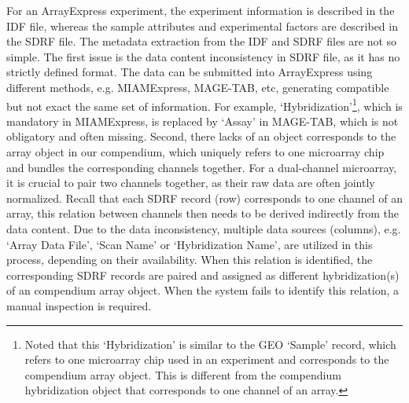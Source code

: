 For an ArrayExpress experiment, the experiment information is described
in the IDF file, whereas the sample attributes and experimental factors
are described in the SDRF file.
%
The metadata extraction from the IDF and SDRF files are not so simple.
%
The first issue is the data content inconsistency in SDRF file, as it has
no strictly defined format.
%
The data can be submitted into ArrayExpress using different methods,
e.g. MIAMExpress, MAGE-TAB, etc, generating compatible but not exact the
same set of information.
%
For example, `Hybridization'\footnote{Noted that this `Hybridization' is
  similar to the GEO `Sample' record, which refers to one microarray chip
  used in an experiment and corresponds to the compendium array object.
  This is different from the compendium hybridization object that
  corresponds to one channel of an array.}, which is mandatory in
MIAMExpress, is replaced by `Assay' in MAGE-TAB, which is not obligatory
and often missing.
%
%
Second, there lacks of an object corresponds to the array object in our
compendium, which uniquely refers to one microarray chip and bundles the
corresponding channels together.
%
For a dual-channel microarray, it is crucial to pair two channels
together, as their raw data are often jointly normalized.
%
Recall that each SDRF record (row) corresponds to one channel of an array,
this relation between channels then needs to be derived indirectly from the
data content.
%
Due to the data inconsistency, multiple data sources (columns), e.g. `Array
Data File', `Scan Name' or `Hybridization Name', are utilized in this process,
depending on their availability.
%
When this relation is identified, the corresponding SDRF records are
paired and assigned as different hybridization(s) of an compendium array
object.
%
When the system fails to identify this relation, a manual inspection is
required.


